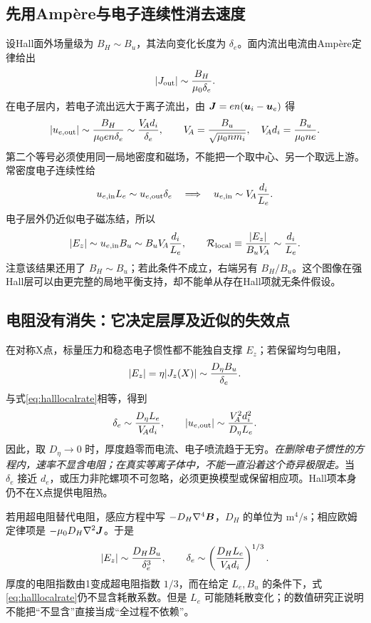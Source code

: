 \subsection{先用Ampère与电子连续性消去速度}
设Hall面外场量级为 $B_H\sim B_u$，其法向变化长度为 $\delta_e$。面内流出电流由Ampère定律给出
\begin{equation}
|J_{\rm out}|\sim{B_H\over\mu_0\delta_e}.
\end{equation}
在电子层内，若电子流出远大于离子流出，由 $\bm{J}=en(\bm{u}_i-\bm{u}_e)$ 得
\begin{equation}
|u_{e,\rm out}|\sim{B_H\over\mu_0en\delta_e}
\sim {V_{\!A}d_i\over\delta_e},\qquad
V_{\!A}={B_u\over\sqrt{\mu_0nm_i}},\quad
V_{\!A} d_i={B_u\over\mu_0ne}.
\end{equation}
第二个等号必须使用同一局地密度和磁场，不能把一个取中心、另一个取远上游。常密度电子连续性给
\begin{equation}
u_{e,\rm in}L_e\sim u_{e,\rm out}\delta_e
\quad\Longrightarrow\quad
u_{e,\rm in}\sim V_{\!A}{d_i\over L_e}.
\end{equation}
电子层外仍近似电子磁冻结，所以
\begin{equation}
|E_z|\sim u_{e,\rm in}B_u
\sim B_uV_{\!A}{d_i\over L_e},\qquad
\mathcal R_{\rm local}\equiv{|E_z|\over B_uV_{\!A}}\sim {d_i\over L_e}.
\label{eq:halllocalrate}
\end{equation}
注意该结果还用了 $B_H\sim B_u$；若此条件不成立，右端另有 $B_H/B_u$。这个图像在强Hall层可以由更完整的局地平衡支持，却不能单从存在Hall项就无条件假设。

\subsection{电阻没有消失：它决定层厚及近似的失效点}
在对称X点，标量压力和稳态电子惯性都不能独自支撑 $E_z$；若保留均匀电阻，
\begin{equation}
|E_z|=\eta|J_z(X)|\sim {D_\eta B_u\over\delta_e}.
\end{equation}
与式\eqref{eq:halllocalrate}相等，得到
\begin{equation}
\delta_e\sim{D_\eta L_e\over V_{\!A}d_i},\qquad
|u_{e,\rm out}|\sim{V_{\!A}^2d_i^2\over D_\eta L_e}.
\label{eq:hallthickness}
\end{equation}
因此，取 $D_\eta\to0$ 时，厚度趋零而电流、电子喷流趋于无穷。\emph{在删除电子惯性的方程内，速率不显含电阻；在真实等离子体中，不能一直沿着这个奇异极限走。}当 $\delta_e$ 接近 $d_e$，或压力非陀螺项不可忽略，必须更换模型或保留相应项。Hall项本身仍不在X点提供电阻热。

若用超电阻替代电阻，感应方程中写 $-D_H\nabla^4\bm{B}$，$D_H$ 的单位为 $\mathrm{m^4/s}$；相应欧姆定律项是 $-\mu_0D_H\nabla^2\bm{J}$。于是
\begin{equation}
|E_z|\sim {D_HB_u\over\delta_e^3},\qquad
\delta_e\sim\left({D_HL_e\over V_{\!A} d_i}\right)^{1/3}.
\end{equation}
厚度的电阻指数由1变成超电阻指数 $1/3$，而在给定 $L_e,B_u$ 的条件下，式\eqref{eq:halllocalrate}仍不显含耗散系数。但是 $L_e$ 可能随耗散变化；\citet{Sullivan2009}的数值研究正说明不能把“不显含”直接当成“全过程不依赖”。

